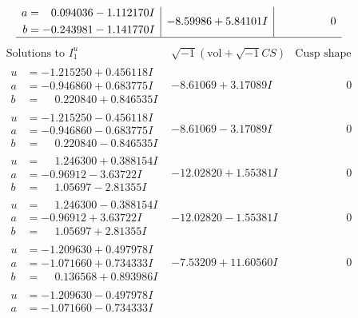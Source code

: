 \documentclass[1p]{elsarticle_modified}
\theoremstyle{definition}
\newcommand{\I}{\sqrt{-1}}
\begin{document}
$$\begin{array}{c|c|c}
\begin{aligned}
a &= \phantom{-}0.094036 - 1.112170 I \\
b &= -0.243981 - 1.141770 I\end{aligned}
 & -8.59986 + 5.84101 I & \phantom{-0.000000 } 0\\
 \hline 
 \end{array}$$\newpage$$\begin{array}{c|c|c}  
\text{Solutions to }I^u_{1}& \I (\text{vol} + \sqrt{-1}CS) & \text{Cusp shape}\\
 \hline 
\begin{aligned}
u &= -1.215250 + 0.456118 I \\
a &= -0.946860 + 0.683775 I \\
b &= \phantom{-}0.220840 + 0.846535 I\end{aligned}
 & -8.61069 + 3.17089 I & \phantom{-0.000000 } 0 \\ \hline\begin{aligned}
u &= -1.215250 - 0.456118 I \\
a &= -0.946860 - 0.683775 I \\
b &= \phantom{-}0.220840 - 0.846535 I\end{aligned}
 & -8.61069 - 3.17089 I & \phantom{-0.000000 } 0 \\ \hline\begin{aligned}
u &= \phantom{-}1.246300 + 0.388154 I \\
a &= -0.96912 - 3.63722 I \\
b &= \phantom{-}1.05697 - 2.81355 I\end{aligned}
 & -12.02820 + 1.55381 I & \phantom{-0.000000 } 0 \\ \hline\begin{aligned}
u &= \phantom{-}1.246300 - 0.388154 I \\
a &= -0.96912 + 3.63722 I \\
b &= \phantom{-}1.05697 + 2.81355 I\end{aligned}
 & -12.02820 - 1.55381 I & \phantom{-0.000000 } 0 \\ \hline\begin{aligned}
u &= -1.209630 + 0.497978 I \\
a &= -1.071660 + 0.734333 I \\
b &= \phantom{-}0.136568 + 0.893986 I\end{aligned}
 & -7.53209 + 11.60560 I & \phantom{-0.000000 } 0 \\ \hline\begin{aligned}
u &= -1.209630 - 0.497978 I \\
a &= -1.071660 - 0.734333 I \\

\end{aligned}
\end{array}$$
\end{document}

